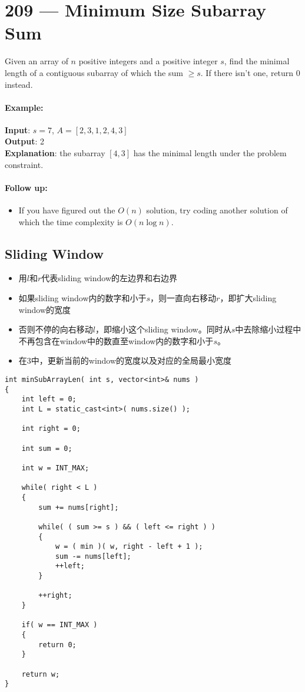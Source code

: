 \section{209 --- Minimum Size Subarray Sum}
Given an array of $n$ positive integers and a positive integer $s$, find the minimal length of a contiguous subarray of which the sum $\geq s$. If there isn't one, return 0 instead.
\paragraph{Example:}
\begin{flushleft}
\textbf{Input}: $s = 7$, $A = [2,3,1,2,4,3]$
\\
\textbf{Output}: 2
\\
\textbf{Explanation}: the subarray $[4,3]$ has the minimal length under the problem constraint.
\end{flushleft}
\paragraph{Follow up:}
\begin{itemize}
\item If you have figured out the $O(n)$ solution, try coding another solution of which the time complexity is $O(n \log n)$.
\end{itemize} 

\subsection{Sliding Window}
\begin{itemize}
\item 用$l$和$r$代表sliding window的左边界和右边界
\item 如果sliding window内的数字和小于$s$，则一直向右移动$r$，即扩大sliding window的宽度
\item 否则不停的向右移动$l$，即缩小这个sliding window。同时从$s$中去除缩小过程中不再包含在window中的数直至window内的数字和小于$s$。
\item 在3中，更新当前的window的宽度以及对应的全局最小宽度
\end{itemize}
\setcounter{lstlisting}{0}
\begin{lstlisting}[style=customc, caption={Sliding Window}]
int minSubArrayLen( int s, vector<int>& nums )
{
    int left = 0;
    int L = static_cast<int>( nums.size() );

    int right = 0;

    int sum = 0;

    int w = INT_MAX;

    while( right < L )
    {
        sum += nums[right];

        while( ( sum >= s ) && ( left <= right ) )
        {
            w = ( min )( w, right - left + 1 );
            sum -= nums[left];
            ++left;
        }

        ++right;
    }

    if( w == INT_MAX )
    {
        return 0;
    }

    return w;
}
\end{lstlisting}

